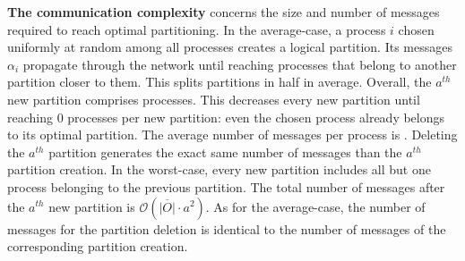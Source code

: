 \textbf{The communication complexity} concerns the size and number of
messages required to reach optimal partitioning. In the average-case,
a process $i$ chosen uniformly at random among all processes creates a
logical partition. Its messages $\alpha_i$ propagate through the
network until reaching processes that belong to another partition
closer to them. This splits partitions in half in average. Overall,
the $a^{th}$ new partition comprises
processes. This decreases every new partition until reaching $0$
processes per new partition: even the chosen process already belongs
to its optimal partition. The average number of messages per process
is .  Deleting the
$a^{th}$ partition generates the exact same number of messages than
the $a^{th}$ partition creation.  In the
worst-case, every new partition includes all but one process belonging
to the previous partition. The total number of messages after the
$a^{th}$ new partition is $\mathcal{O}(\overline{|O|}\cdot a^2)$. As
for the average-case, the number of messages for the partition
deletion is identical to the number of messages of the corresponding
partition creation.

